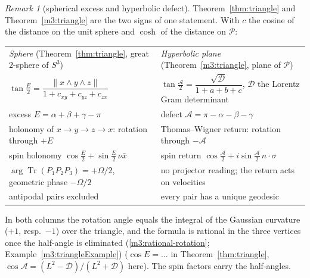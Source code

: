 \documentclass[11pt,reqno]{amsart}
\theoremstyle{definition}
\theoremstyle{remark}
\newtheorem{remark}[theorem]{Remark}
\numberwithin{equation}{section}
\begin{document}
\begin{remark}[spherical excess and hyperbolic defect]\label{m3:twocolumn}
Theorem~\ref{thm:triangle} and Theorem~\ref{m3:triangle} are the two signs of one statement.  With $c$ the cosine of the
distance on the unit sphere and $\cosh$ of the distance on $\mathcal P$:
\begin{center}\small
\begin{tabular}{p{}p{}}
\emph{Sphere} (Theorem~\ref{thm:triangle}, great $2$-sphere of $S^3$) & \emph{Hyperbolic plane} (Theorem~\ref{m3:triangle}, plane of $\mathcal P$)\\[2pt]
$\tan\frac E2=\dfrac{\lVert x\wedge y\wedge z\rVert}{1+c_{xy}+c_{yz}+c_{zx}}$ &
$\tan\frac{\mathcal A}2=\dfrac{\sqrt{\mathcal D}}{1+a+b+c}$, $\mathcal D$ the Lorentz Gram determinant\\[4pt]
excess $E=\alpha+\beta+\gamma-\pi$ & defect $\mathcal A=\pi-\alpha-\beta-\gamma$\\
holonomy of $x\to y\to z\to x$: rotation through $+E$ & Thomas--Wigner return: rotation through $-\mathcal A$\\
spin holonomy $\cos\frac E2+\sin\frac E2\,\nu\bar x$ & spin return $\cos\frac{\mathcal A}2+i\sin\frac{\mathcal A}2\,n\cdot\sigma$\\
$\arg\operatorname{Tr}(P_1P_2P_3)=+\Omega/2$, geometric phase $-\Omega/2$ & no projector reading; the return acts on velocities\\
antipodal pairs excluded & every pair has a unique geodesic
\end{tabular}
\end{center}
In both columns the rotation angle equals the integral of the Gaussian curvature ($+1$, resp.\ $-1$) over the triangle, and the
formula is rational in the three vertices once the half-angle is eliminated (\eqref{m3:rational-rotation}; Example~\ref{m3:triangleExample}) ($\cos E=\dots$ in Theorem~\ref{thm:triangle},
$\cos\mathcal A=(L^2-\mathcal D)/(L^2+\mathcal D)$ here).  The spin factors carry the half-angles.
\end{remark}
\end{document}
